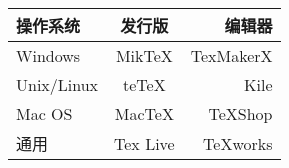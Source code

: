 \documentclass[UTF8]{ctexart}
\begin{document}
\begin{tabular}{|l|c|r|}
\hline
操作系统& 发行版& 编辑器\\
\hline
Windows& MikTeX& TexMakerX \\
\hline
Unix/Linux& teTeX & Kile \\
\hline
Mac OS& MacTeX& TeXShop \\
\hline
通用& Tex Live & TeXworks \\
\hline
\end{tabular}
\end{document}
